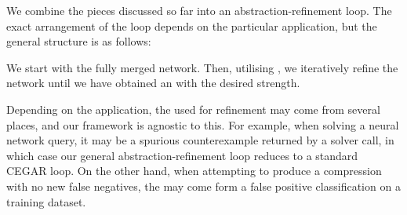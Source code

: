 We combine the pieces discussed so far into an abstraction-refinement loop. The
exact arrangement of the loop depends on the particular application, but the
general structure is as follows:

We start with the fully merged network. Then, utilising \gencex, we iteratively
refine the network until we have obtained an \abs with the desired strength.

Depending on the application, the \gencex used for refinement may come from
several places, and our framework is agnostic to this. For example, when solving
a neural network query, it may be a spurious counterexample returned by a solver
call, in which case our general abstraction-refinement loop reduces to a
standard CEGAR loop. On the other hand, when attempting to produce a compression
with no new false negatives, the \gencex may come form a false positive
classification on a training dataset.
